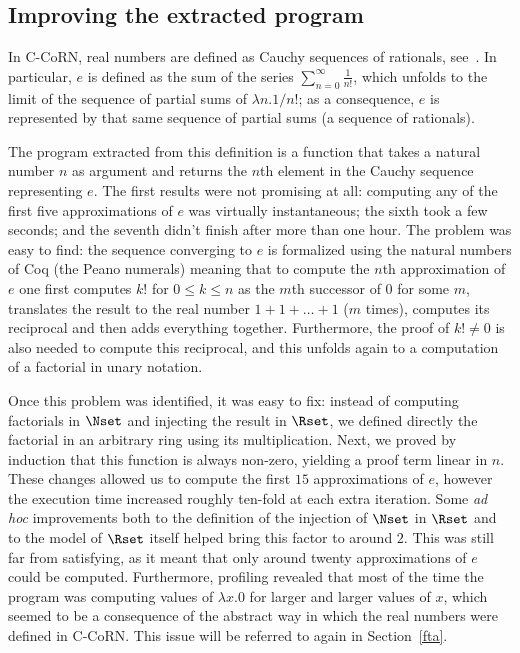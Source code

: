\documentclass{entcs}
\begin{document}
\subsection{Improving the extracted program}

In C-CoRN, real numbers are defined as Cauchy sequences of rationals,
see~\cite{geu:niq:02}.
In particular, $e$ is defined as the sum of the series
$\sum_{n=0}^\infty\frac1{n!}$, which unfolds to the limit of the
sequence of partial sums of $\lambda n.1/n!$; as a consequence, $e$
is represented by that same sequence of partial sums (a
sequence of rationals).

The program extracted from this definition is a function that takes a natural
number $n$ as argument and returns the $n$th element in the Cauchy
sequence representing $e$.
The first results were not promising at all: computing any of the
first five approximations of $e$ was virtually instantaneous; the
sixth took a few seconds; and the seventh didn't finish after more
than one hour.  The problem was easy to find: the
sequence converging to $e$ is formalized using the natural
numbers of Coq (the Peano numerals) meaning that to compute
the $n$th approximation of $e$
one first computes $k!$ for $0\leq k\leq n$ as the $m$th successor of
$0$ for some $m$, translates the result to the real number $1+1+\ldots+1$
($m$ times), computes its reciprocal and then adds everything together.
Furthermore, the proof of $k!\neq0$ is also needed to compute this
reciprocal, and this unfolds again to a computation of a factorial in
unary notation.

Once this problem was identified, it was easy to fix: instead of
computing factorials in
$\Nset$ and injecting the result in $\Rset$, we defined directly the
factorial in an arbitrary ring using its multiplication.
Next, we proved by induction that this function is
always non-zero, yielding a proof term linear in $n$.
These changes allowed us to compute the first $15$ approximations
of $e$, however the execution time increased roughly ten-fold
at each extra iteration.
Some \emph{ad hoc} improvements both to the definition of the injection of
$\Nset$ in $\Rset$ and to the model of $\Rset$ itself helped bring this
factor to around $2$.  This was still far from satisfying, as
it meant that only around twenty approximations of $e$ could be computed.
Furthermore, profiling revealed that most of the time the program was
computing values of $\lambda x.0$ for larger and larger values of $x$,
which seemed to be a consequence of the abstract way in which the real numbers
were defined in C-CoRN.  This issue will be referred to again in
Section~\ref{fta}.
\end{document}
